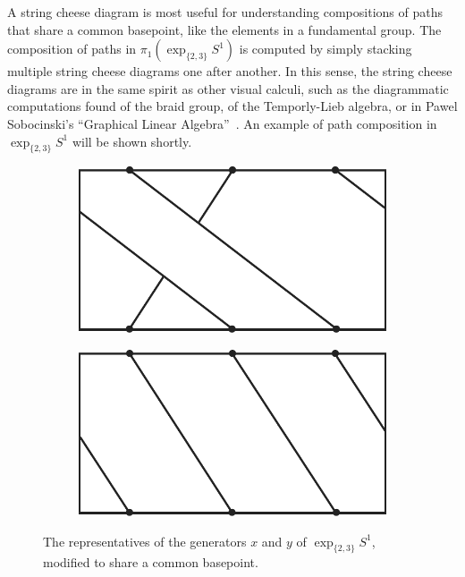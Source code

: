 \documentclass[12pt,twoside]{reedthesis}
\theoremstyle{definition}
\newcommand{\exptwothree}{\exp_{\{2,3\}}}
\begin{document}
A string cheese diagram is most useful for understanding compositions of paths that share a common basepoint, like the elements in a fundamental group.
The composition of paths in $\pi_1(\exptwothree S^1)$ is computed by simply stacking multiple string cheese diagrams one after another.
In this sense, the string cheese diagrams are in the same spirit as other visual calculi, such as the diagrammatic computations found of the braid group, of the Temporly-Lieb algebra, or in Pawel Sobocinski's ``Graphical Linear Algebra''~\cite{graphicallinearalgebra}.
An example of path composition in $\exptwothree S^1$ will be shown shortly.

\begin{figure}[h]
  \centering
  \begin{subfigure}[t]{0.23\textwidth}
    \centering
    \includegraphics[width=\textwidth]{figures/braid_gen_x.pdf}
  \end{subfigure}
  \hspace{5mm}
  \begin{subfigure}[t]{0.23\textwidth}
    \centering
    \includegraphics[width=\textwidth]{figures/braid_gen_y.pdf}
  \end{subfigure}
  \caption{The representatives of the generators $x$ and $y$ of $\exptwothree S^1$, modified to share a common basepoint.}
  \label{fig:common_basepoint_generators}
\end{figure}
\end{document}
